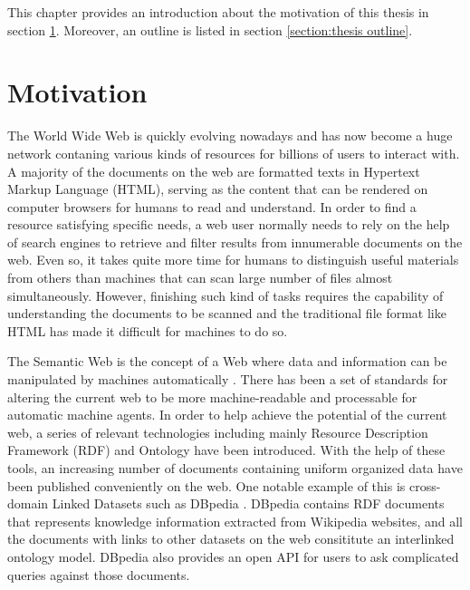 

This chapter provides an introduction about the motivation of this thesis in section \ref{section:motivation}. Moreover, an outline is listed in section \ref{section:thesis outline}.


\section{Motivation} \label{section:motivation}
The World Wide Web is quickly evolving nowadays and has now become a huge network contaning various kinds of resources for billions of users to interact with. A majority of the documents on the web are formatted texts in Hypertext Markup Language (HTML), serving as the content that can be rendered on computer browsers for humans to read and understand. In order to find a resource satisfying specific needs, a web user normally needs to rely on the help of search engines to retrieve and filter results from innumerable documents on the web. Even so, it takes quite more time for humans to distinguish useful materials from others than machines that can scan large number of files almost simultaneously. However, finishing such kind of tasks requires the capability of understanding the documents to be scanned and the traditional file format like HTML has made it difficult for machines to do so.

The Semantic Web is the concept of a Web where data and information can be manipulated by machines automatically \cite{Shadbolt2006}. There has been a set of standards for altering the current web to be more machine-readable and processable for automatic machine agents. In order to help achieve the potential of the current web, a series of relevant technologies including mainly Resource Description Framework (RDF) \cite{Cyganiak2014} and Ontology have been introduced. With the help of these tools, an increasing number of documents containing uniform organized data have been published conveniently on the web. One notable example of this is cross-domain Linked Datasets such as DBpedia \cite{Auer2007}. DBpedia contains RDF documents that represents knowledge information extracted from Wikipedia websites, and all the documents with links to other datasets on the web consititute an interlinked ontology model. DBpedia also provides an open API for users to ask complicated queries against those documents.

